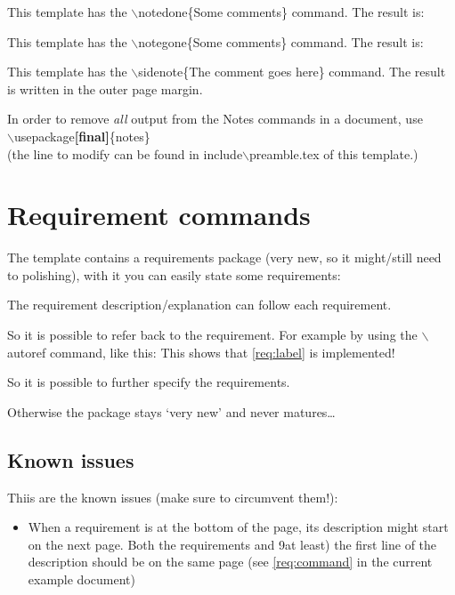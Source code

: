This template has the $\backslash$notedone\{Some comments\} command.
The result is:\par
{}

This template has the $\backslash$notegone\{Some comments\} command.
The result is:\par
{}

This template has the $\backslash$sidenote\{The comment goes here\} command.
The result is written in the outer page margin.\par
{}

In order to remove \textit{all} output from the Notes commands in a document, use\\[3pt]
$\backslash$usepackage\textbf{[final]}\{notes\}\\[3pt]
(the line to modify can be found in include$\backslash$preamble.tex of this template.)

\section{Requirement commands}
The template contains a requirements package (very new, so it might/still need to polishing), with it you can easily state some requirements:

The requirement description/explanation can follow each requirement.

So it is possible to refer back to the requirement.
For example by using the $\backslash$autoref command, like this: This shows that \autoref{req:label} is implemented!

So it is possible to further specify the requirements.

Otherwise the package stays `very new' and never matures\ldots

\subsection{Known issues}
Thiis are the known issues (make sure to circumvent them!):
\begin{itemize}
\item When a requirement is at the bottom of the page, its description might start on the next page. Both the requirements and 9at least) the first line of the description should be on the same page (see \autoref{req:command} in the current example document)
\end{itemize}

